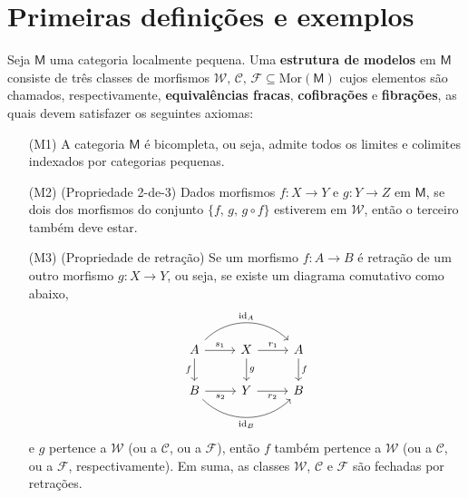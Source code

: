 \section{Primeiras definições e exemplos}

\begin{defin}\label{defin:estrutura_de_modelos}
  Seja $\mathsf{M}$ uma categoria localmente pequena.
  Uma \textbf{estrutura de modelos} em $\mathsf{M}$ consiste de três classes de morfismos $\mathcal{W},\, \mathcal{C},\, \mathcal{F} \subseteq \mathrm{Mor}(\mathsf{M})$ cujos elementos são chamados, respectivamente, \textbf{equivalências fracas}, \textbf{cofibrações} e \textbf{fibrações}, as quais devem satisfazer os seguintes axiomas:
  \begin{enumerate}
  \item[(M1)] A categoria $\mathsf{M}$ é bicompleta, ou seja, admite todos os limites e colimites indexados por categorias pequenas.
    
  \item[(M2)] (Propriedade 2-de-3) Dados morfismos $f: X \to Y$ e $g: Y \to Z$ em $\mathsf{M}$, se dois dos morfismos do conjunto $\{f,\,g,\, g \circ f\}$ estiverem em $\mathcal{W}$, então o terceiro também deve estar.
    
  \item[(M3)] (Propriedade de retração) Se um morfismo $f: A \to B$ é retração de um outro morfismo $g: X \to Y$, ou seja, se existe um diagrama comutativo como abaixo,
    \begin{equation}\label{eq:diagrama_axioma_de_retracao}
      \begin{tikzcd}
        A
        \arrow[r, "s_1"]
        \arrow[d, "f" swap]
        \arrow[rr, bend left=45, "\id_{A}"]
        & X
        \arrow[r, "r_1"]
        \arrow[d, "g"]
        & A
        \arrow[d, "f"]
        \\ B
        \arrow[r, "s_2" swap]
        \arrow[rr, bend right=45, "\id_{B}" swap]
        & Y
        \arrow[r, "r_2" swap]
        & B
      \end{tikzcd}
    \end{equation}
    e $g$ pertence a $\mathcal{W}$ (ou a $\mathcal{C}$, ou a $\mathcal{F}$), então $f$ também pertence a $\mathcal{W}$ (ou a $\mathcal{C}$, ou a $\mathcal{F}$, respectivamente).
    Em suma, as classes $\mathcal{W}$, $\mathcal{C}$ e $\mathcal{F}$ são fechadas por retrações.
    

\end{enumerate}
\end{defin}
